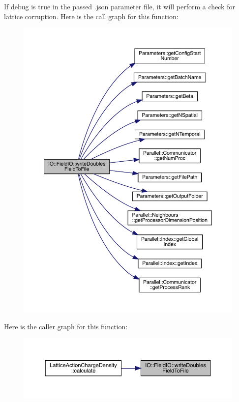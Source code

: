 If debug is true in the passed .json parameter file, it will perform a check for lattice corruption. Here is the call graph for this function\+:
\nopagebreak
\begin{figure}[H]
\begin{center}
\leavevmode
\includegraphics[width=350pt]{class_i_o_1_1_field_i_o_aaf2bac2025d67c06e7c61e8cc9f44777_cgraph}
\end{center}
\end{figure}
Here is the caller graph for this function\+:
\nopagebreak
\begin{figure}[H]
\begin{center}
\leavevmode
\includegraphics[width=350pt]{class_i_o_1_1_field_i_o_aaf2bac2025d67c06e7c61e8cc9f44777_icgraph}
\end{center}
\end{figure}
\mbox{\label{class_i_o_1_1_field_i_o_a8af607f9a1d79e90d4514c36103c6601}} 
